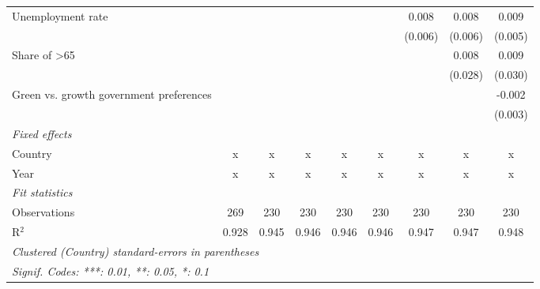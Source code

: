 \begin{table}[htbp]
\begin{tabular}{lcccccccc}
      Unemployment rate                                &              &              &         &         &         & 0.008   & 0.008   & 0.009\\   
                                                       &              &              &         &         &         & (0.006) & (0.006) & (0.005)\\   
      Share of >65                                     &              &              &         &         &         &         & 0.008   & 0.009\\   
                                                       &              &              &         &         &         &         & (0.028) & (0.030)\\   
      Green vs. growth government preferences          &              &              &         &         &         &         &         & -0.002\\   
                                                       &              &              &         &         &         &         &         & (0.003)\\   
      \emph{Fixed effects}\\
      Country                                          & x            & x            & x       & x       & x       & x       & x       & x\\  
      Year                                             & x            & x            & x       & x       & x       & x       & x       & x\\  
      \midrule \emph{Fit statistics}\\
      Observations                                     & 269          & 230          & 230     & 230     & 230     & 230     & 230     & 230\\  
      R$^2$                                            & 0.928        & 0.945        & 0.946   & 0.946   & 0.946   & 0.947   & 0.947   & 0.948\\  
      \midrule
      \multicolumn{9}{l}{\emph{Clustered (Country) standard-errors in parentheses}}\\
      \multicolumn{9}{l}{\emph{Signif. Codes: ***: 0.01, **: 0.05, *: 0.1}}\\
   \end{tabular}
\end{table}


